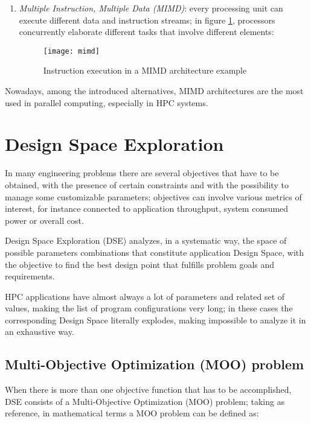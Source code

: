 \begin{enumerate}
    \item \textit{Multiple Instruction, Multiple Data (MIMD)}: every processing unit can execute different data and instruction streams; in figure \ref{fig::mimd}, processors concurrently elaborate different tasks that involve different elements:
    
    \begin{figure}[H]

        \centering
        \texttt{[image: mimd]}
        \caption{Instruction execution in a MIMD architecture example}
        \label{fig::mimd}
    
    \end{figure}

\end{enumerate}

Nowadays, among the introduced alternatives, MIMD architectures are the most used in parallel computing, especially in HPC systems.





\section{Design Space Exploration}

In many engineering problems there are several objectives that have to be obtained, with the presence of certain constraints and with the possibility to manage some customizable parameters; objectives can involve various metrics of interest, for instance connected to application throughput, system consumed power or overall cost.

Design Space Exploration (DSE) analyzes, in a systematic way, the space of possible parameters combinations that constitute application Design Space, with the objective to find the best design point that fulfills problem goals and requirements.

HPC applications have almost always a lot of parameters and related set of values, making the list of program configurations very long; in these cases the corresponding Design Space literally explodes, making impossible to analyze it in an exhaustive way.

\subsection{Multi-Objective Optimization (MOO) problem}

When there is more than one objective function that has to be accomplished, DSE consists of a Multi-Objective Optimization (MOO) problem; taking \cite{caramia2008multi} as reference, in mathematical terms a MOO problem can be defined as:

